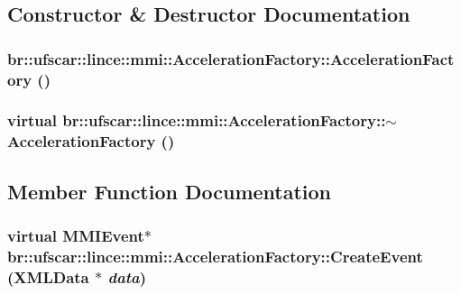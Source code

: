 \subsection{Constructor \& Destructor Documentation}
\hypertarget{classbr_1_1ufscar_1_1lince_1_1mmi_1_1AccelerationFactory_aeba6ded86331f14a169b9e507a0e6531}{
\subsubsection[{AccelerationFactory}]{\setlength{\rightskip}{0pt plus 5cm}br::ufscar::lince::mmi::AccelerationFactory::AccelerationFactory ()}}
\label{classbr_1_1ufscar_1_1lince_1_1mmi_1_1AccelerationFactory_aeba6ded86331f14a169b9e507a0e6531}
\hypertarget{classbr_1_1ufscar_1_1lince_1_1mmi_1_1AccelerationFactory_a5df5c784ea0f38f5adbd54a213bb0852}{
\subsubsection[{$\sim$AccelerationFactory}]{\setlength{\rightskip}{0pt plus 5cm}virtual br::ufscar::lince::mmi::AccelerationFactory::$\sim$AccelerationFactory ()}}
\label{classbr_1_1ufscar_1_1lince_1_1mmi_1_1AccelerationFactory_a5df5c784ea0f38f5adbd54a213bb0852}


\subsection{Member Function Documentation}
\hypertarget{classbr_1_1ufscar_1_1lince_1_1mmi_1_1AccelerationFactory_a5b8858d27f1b956b6c1f27648c010d74}{
\subsubsection[{CreateEvent}]{\setlength{\rightskip}{0pt plus 5cm}virtual {\bf MMIEvent}$\ast$ br::ufscar::lince::mmi::AccelerationFactory::CreateEvent ({\bf XMLData} $\ast$ {\em data})}}
\label{classbr_1_1ufscar_1_1lince_1_1mmi_1_1AccelerationFactory_a5b8858d27f1b956b6c1f27648c010d74}


